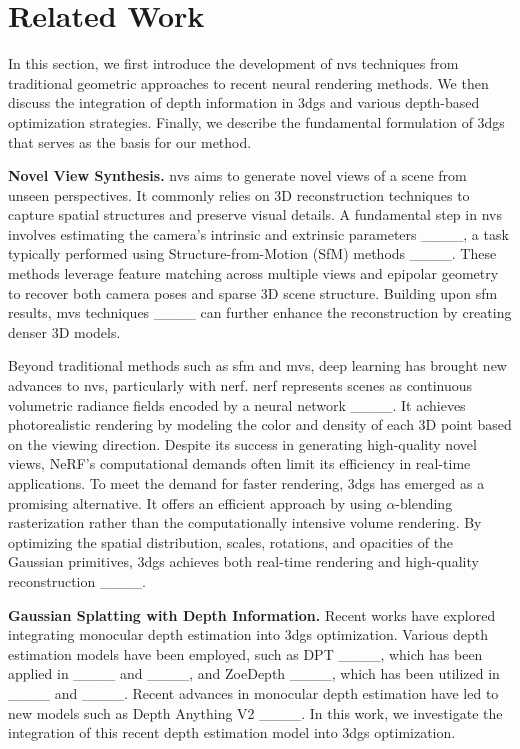 \section{Related Work}
\label{Related Work}
\begin{sloppypar}
In this section, we first introduce the development of \gls{nvs} techniques from traditional geometric approaches to recent neural rendering methods. 
We then discuss the integration of depth information in \gls{3dgs} and various depth-based optimization strategies. 
Finally, we describe the fundamental formulation of \gls{3dgs} that serves as the basis for our method. 

\textbf{Novel View Synthesis.} 
\gls{nvs} aims to generate novel views of a scene from unseen perspectives. It commonly relies on 3D reconstruction techniques to capture spatial structures and preserve visual details. 
A fundamental step in \gls{nvs} involves estimating the camera’s intrinsic and extrinsic parameters ____, a task typically performed using Structure-from-Motion (SfM) methods ____. 
These methods leverage feature matching across multiple views and epipolar geometry to recover both camera poses and sparse 3D scene structure. 
Building upon \gls{sfm} results, \gls{mvs} techniques ____ can further enhance the reconstruction by creating denser 3D models. 

Beyond traditional methods such as \gls{sfm} and \gls{mvs}, deep learning has brought new advances to \gls{nvs}, particularly with \gls{nerf}. 
\gls{nerf} represents scenes as continuous volumetric radiance fields encoded by a neural network ____. It achieves photorealistic rendering by modeling the color and density of each 3D point based on the viewing direction. 
Despite its success in generating high-quality novel views, NeRF’s computational demands often limit its efficiency in real-time applications. 
To meet the demand for faster rendering, \gls{3dgs} has emerged as a promising alternative. It offers an efficient approach by using \(\alpha\)-blending rasterization rather than the computationally intensive volume rendering. 
By optimizing the spatial distribution, scales, rotations, and opacities of the Gaussian primitives, \gls{3dgs} achieves both real-time rendering and high-quality reconstruction ____. 

\textbf{Gaussian Splatting with Depth Information.} 
Recent works have explored integrating monocular depth estimation into \gls{3dgs} optimization. 
Various depth estimation models have been employed, such as DPT ____, which has been applied in ____ and ____, and ZoeDepth ____, which has been utilized in ____ and ____. 
Recent advances in monocular depth estimation have led to new models such as Depth Anything V2 ____. 
In this work, we investigate the integration of this recent depth estimation model into \gls{3dgs} optimization.


\end{sloppypar}
